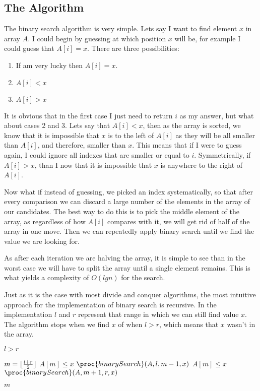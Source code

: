 \documentclass{article}
\DeclarePairedDelimiter\floor{\lfloor}{\rfloor}
\begin{document}
\subsection{The Algorithm}

The binary search algorithm is very simple. Lets say I want to find element $x$ in array $A$. I could begin by guessing at which position $x$ will be, for example I could guess that $A[i] = x$. There are three possibilities:

\begin{enumerate}
	\item If am very lucky then $A[i] = x$.
	\item $A[i] < x$
	\item $A[i] > x$
\end{enumerate}

It is obvious that in the first case I just need to return $i$ as my answer, but what about cases 2 and 3. Lets say that $A[i] < x$, then as the array is sorted, we know that it is impossible that $x$ is to the left of $A[i]$ as they will be all smaller than $A[i]$, and therefore, smaller than $x$. This means that if I were to guess again, I could ignore all indexes that are smaller or equal to $i$. Symmetrically, if $A[i] > x$, than I now that it is impossible that $x$ is anywhere to the right of $A[i]$.

Now what if instead of guessing, we picked an index systematically, so that after every comparison we can discard a large number of the elements in the array of our candidates. The best way to do this is to pick the middle element of the array, as regardless of how $A[i]$ compares with it, we will get rid of half of the array in one move. Then we can repeatedly apply binary search until we find the value we are looking for.

As after each iteration we are halving the array, it is simple to see than in the worst case we will have to split the array until a single element remains. This is what yields a complexity of $O(lgn)$ for the search.

Just as it is the case with most divide and conquer algorithms, the most intuitive approach for the implementation of binary search is recursive. In the implementation $l$ and $r$ represent that range in which we can still find value $x$. The algorithm stops when we find $x$ of when $l > r$, which means that $x$ wasn't in the array.

\begin{codebox}
	\li \If $l > r$ \li \Then
	\End

	\li $m = \floor{\frac{l + r}{2}}$
	\li \If $A[m] \leq x$ \li \Then 
		\Return $\proc{binarySearch}(A, l, m - 1, x)$
	\End
	\li \If $A[m] \leq x$ \li \Then 
		\Return $\proc{binarySearch}(A, m + 1, r, x)$
	\End
	
	\li \Return $m$
\end{codebox}
\end{document}
